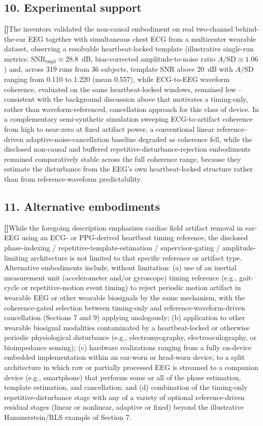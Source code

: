 \documentclass[12pt]{article}
\newcounter{para}
\newcommand{\parnum}{\stepcounter{para}\noindent\textbf{[\thepara]}\quad}
\begin{document}
\subsection*{10. Experimental support}

\parnum The inventors validated the non-causal embodiment on real two-channel behind-the-ear EEG together with simultaneous chest ECG from a multicenter wearable dataset, observing a resolvable heartbeat-locked template (illustrative single-run metrics: $\mathrm{SNR}_{\mathrm{tmpl}} \approx 28.8$~dB, bias-corrected amplitude-to-noise ratio $A/\mathrm{SD}\approx 1.06$) and, across 319 runs from 36 subjects, template SNR above 20~dB with $A/\mathrm{SD}$ ranging from 0.110 to 1.220 (mean 0.557), while ECG-to-EEG waveform coherence, evaluated on the same heartbeat-locked windows, remained low -- consistent with the background discussion above that motivates a timing-only, rather than waveform-referenced, cancellation approach for this class of device. In a complementary semi-synthetic simulation sweeping ECG-to-artifact coherence from high to near-zero at fixed artifact power, a conventional linear reference-driven adaptive-noise-cancellation baseline degraded as coherence fell, while the disclosed non-causal and buffered repetitive-disturbance-rejection embodiments remained comparatively stable across the full coherence range, because they estimate the disturbance from the EEG's own heartbeat-locked structure rather than from reference-waveform predictability.

\subsection*{11. Alternative embodiments}

\parnum While the foregoing description emphasizes cardiac field artifact removal in ear-EEG using an ECG- or PPG-derived heartbeat timing reference, the disclosed phase-indexing / repetitive-template-estimation / supervisor-gating / amplitude-limiting architecture is not limited to that specific reference or artifact type. Alternative embodiments include, without limitation: (a) use of an inertial measurement unit (accelerometer and/or gyroscope) timing reference (e.g., gait-cycle or repetitive-motion event timing) to reject periodic motion artifact in wearable EEG or other wearable biosignals by the same mechanism, with the coherence-gated selection between timing-only and reference-waveform-driven cancellation (Sections 7 and 9) applying analogously; (b) application to other wearable biosignal modalities contaminated by a heartbeat-locked or otherwise periodic physiological disturbance (e.g., electromyography, electrooculography, or bioimpedance sensing); (c) hardware realizations ranging from a fully on-device embedded implementation within an ear-worn or head-worn device, to a split architecture in which raw or partially processed EEG is streamed to a companion device (e.g., smartphone) that performs some or all of the phase estimation, template estimation, and cancellation; and (d) combination of the timing-only repetitive-disturbance stage with any of a variety of optional reference-driven residual stages (linear or nonlinear, adaptive or fixed) beyond the illustrative Hammerstein/RLS example of Section 7.
\end{document}
